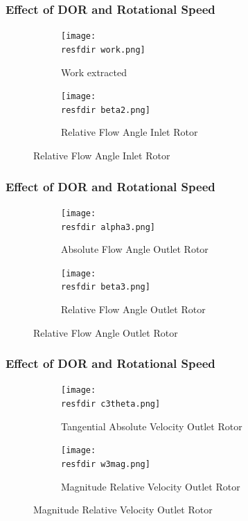 \documentclass{beamer}
\newcommand{\resfdir}{../results/figures/}
\begin{document}
\begin{frame}
	\frametitle{Effect of DOR and Rotational Speed }

	\begin{figure}
	  \begin{subfigure}[b]{0.49\textwidth}
	    \texttt{[image: \\resfdir work.png]}
	    \caption{Work extracted}
	    \label{fig:1}
	  \end{subfigure}
	  \begin{subfigure}[b]{0.49\textwidth}
	    \texttt{[image: \\resfdir beta2.png]}
	    \caption{Relative Flow Angle Inlet Rotor}
	    \label{fig:2}
	  \end{subfigure}
	\end{figure}
\end{frame}

\begin{frame}
	\frametitle{Effect of DOR and Rotational Speed }

	\begin{figure}
	  \begin{subfigure}[b]{0.49\textwidth}
	    \texttt{[image: \\resfdir alpha3.png]}
	    \caption{Absolute Flow Angle Outlet Rotor}
	    \label{fig:1}
	  \end{subfigure}
	  \begin{subfigure}[b]{0.49\textwidth}
	    \texttt{[image: \\resfdir beta3.png]}
	    \caption{Relative Flow Angle Outlet Rotor}
	    \label{fig:2}
	  \end{subfigure}
	\end{figure}
\end{frame}

\begin{frame}
	\frametitle{Effect of DOR and Rotational Speed }

	\begin{figure}
	  \begin{subfigure}[b]{0.49\textwidth}
	    \texttt{[image: \\resfdir c3theta.png]}
	    \caption{Tangential Absolute Velocity Outlet Rotor}
	    \label{fig:1}
	  \end{subfigure}
	  \begin{subfigure}[b]{0.49\textwidth}
	    \texttt{[image: \\resfdir w3mag.png]}
	    \caption{Magnitude Relative Velocity Outlet Rotor}
	    \label{fig:2}
	  \end{subfigure}
	\end{figure}
\end{frame}
\end{document}
